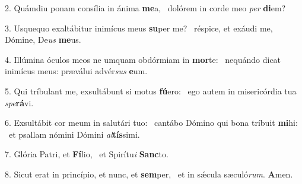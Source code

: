 2. Quámdiu ponam consília in ánima \textbf{me}a, \ast\  dolórem in corde meo \textit{per} \textbf{di}em?\

3. Usquequo exaltábitur inimícus meus \textbf{su}per me? \ast\  réspice, et exáudi me, Dómine, De\textit{us} \textbf{me}us.\

4. Illúmina óculos meos ne umquam obdórmiam in \textbf{mor}te: \ast\  nequándo dicat inimícus meus: præválui advér\textit{sus} \textbf{e}um.\

5. Qui tríbulant me, exsultábunt si motus \textbf{fú}ero: \ast\  ego autem in misericórdia tua \textit{spe}\textbf{rá}vi.\

6. Exsultábit cor meum in salutári tuo: \dag\  cantábo Dómino qui bona tríbuit \textbf{mi}hi: \ast\  et psallam nómini Dómini \textit{al}\textbf{tís}simi.\

7. Glória Patri, et \textbf{Fí}lio, \ast\  et Spirítu\textit{i} \textbf{Sanc}to.\

8. Sicut erat in princípio, et nunc, et \textbf{sem}per, \ast\  et in sǽcula sæculó\textit{rum}. \textbf{A}men.\

